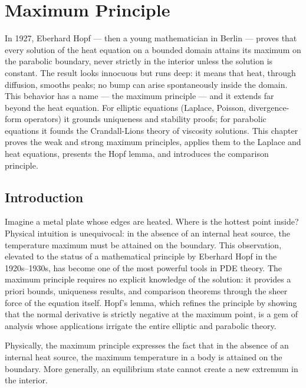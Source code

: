\chapter{Maximum Principle}
\label{ch:maximum}

In 1927, Eberhard Hopf --- then a young mathematician in Berlin --- proves that every solution of the heat equation on a bounded domain attains its maximum on the parabolic boundary, never strictly in the interior unless the solution is constant. The result looks innocuous but runs deep: it means that heat, through diffusion, smooths peaks; no bump can arise spontaneously inside the domain. This behavior has a name --- the maximum principle --- and it extends far beyond the heat equation. For elliptic equations (Laplace, Poisson, divergence-form operators) it grounds uniqueness and stability proofs; for parabolic equations it founds the Crandall-Lions theory of viscosity solutions. This chapter proves the weak and strong maximum principles, applies them to the Laplace and heat equations, presents the Hopf lemma, and introduces the comparison principle.

\section{Introduction}

Imagine a metal plate whose edges are heated. Where is the hottest point inside? Physical intuition is unequivocal: in the absence of an internal heat source, the temperature maximum must be attained on the boundary. This observation, elevated to the status of a mathematical principle by Eberhard Hopf in the 1920s--1930s, has become one of the most powerful tools in PDE theory. The maximum principle requires no explicit knowledge of the solution: it provides a priori bounds, uniqueness results, and comparison theorems through the sheer force of the equation itself. Hopf's lemma, which refines the principle by showing that the normal derivative is strictly negative at the maximum point, is a gem of analysis whose applications irrigate the entire elliptic and parabolic theory.

\begin{intuition}
Physically, the maximum principle expresses the fact that in the absence
of an internal heat source, the maximum temperature in a body is attained
on the boundary. More generally, an equilibrium state cannot create a new
extremum in the interior.
\end{intuition}

